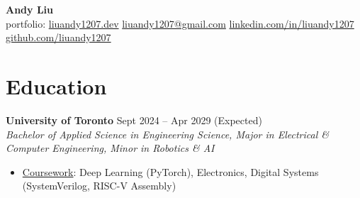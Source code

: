 \documentclass[10pt,letterpaper]{article}
\begin{document}
\begin{center}
\huge{\textbf{Andy Liu}} \\
\vspace{0.25em}
\small{{portfolio: 
    \href{https://liuandy1207.dev}{liuandy1207.dev}}
    \hspace{0.5em} \textbar\hspace{0.5em}
    \href{mailto: liuandy1207@gmail.com}{liuandy1207@gmail.com}
    \hspace{0.5em} \textbar\hspace{0.5em}
    \href{https://www.linkedin.com/in/liuandy1207/}{linkedin.com/in/liuandy1207}}
    \hspace{0.5em} \textbar\hspace{0.5em}
    \href{https://github.com/liuandy1207}{github.com/liuandy1207}
\end{center} \vspace{-0.7em}







\section{Education}

\textbf{University of Toronto} \hfill
Sept 2024 -- Apr 2029 (Expected) \\
\textit{Bachelor of Applied Science in Engineering Science, Major in Electrical \& Computer Engineering, Minor in Robotics \& AI} \hfill 
\begin{itemize}
    \item \underline{Coursework}: 
    Deep Learning (PyTorch), Electronics, 
    Digital Systems (SystemVerilog, RISC-V Assembly)
\end{itemize} \vspace{0.25em}
\end{document}
